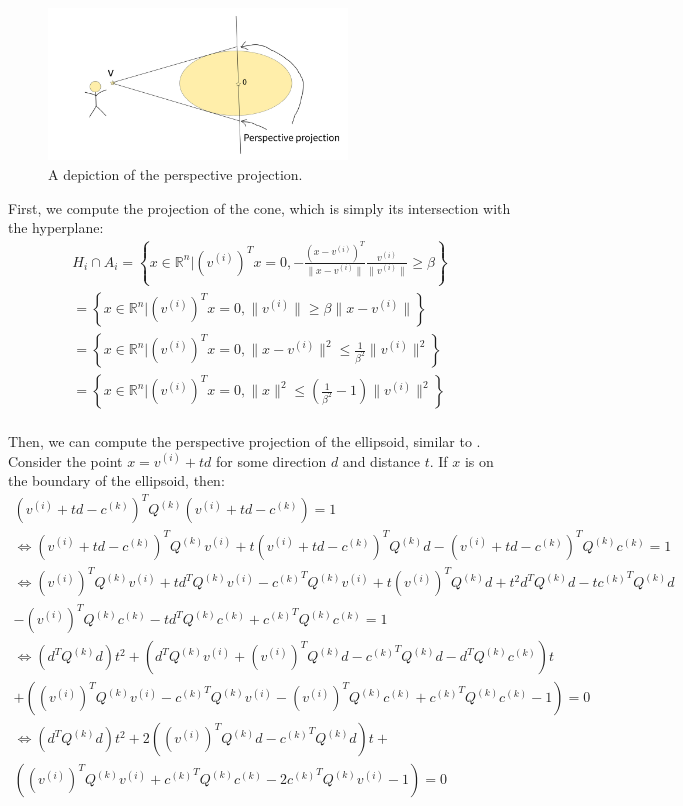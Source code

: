 \documentclass{article}
\theoremstyle{case}
\numberwithin{theorem}{subsection}
\newcommand{\ck}{{c^{(k)}}}
\newcommand{\qk}{{Q^{(k)}}}
\newcommand{\Rn}{\mathbb R^n}
\begin{document}
\begin{figure}[ht]
    \centering
    \includegraphics[width=300px]{images/perspective_projection.png}
    \caption{
    	A depiction of the perspective projection.
	}
    \label{perspective_projection_depiction}
\end{figure}

First, we compute the projection of the cone, which is simply its intersection with the hyperplane:
\begin{align*}
H_i \cap A_i 
= \left\{x \in \Rn \bigg| \left(v^{(i)}\right)^Tx = 0, -\frac{\left(x - v^{(i)}\right)^T}{\|x - v^{(i)}\|}\frac{v^{(i)}}{\|v^{(i)}\|}\ge \beta \right\} \\
= \left\{x \in \Rn \bigg| \left(v^{(i)}\right)^Tx = 0, \|v^{(i)}\|\ge \beta\|x - v^{(i)}\| \right\} \\
= \left\{x \in \Rn \bigg| \left(v^{(i)}\right)^Tx = 0, \|x - v^{(i)}\|^2 \le \frac 1 {\beta^2}\|v^{(i)}\|^2 \right\} \\
= \left\{x \in \Rn \bigg| \left(v^{(i)}\right)^Tx = 0, \|x\|^2 \le \left(\frac 1 {\beta^2} - 1\right)\|v^{(i)}\|^2 \right\} \\
\end{align*}

Then, we can compute the perspective projection of the ellipsoid, similar to \cite{eberly_2013}.
Consider the point $x = v^{(i)} + td$ for some direction $d$ and distance $t$.
If $x$ is on the boundary of the ellipsoid, then:
\begin{align*}
(v^{(i)} + t d - \ck )^T \qk  (v^{(i)} + t d - \ck ) = 1 \\
\Longleftrightarrow (v^{(i)} + t d - \ck )^T \qk  v^{(i)} + t (v^{(i)} + t d - \ck )^T \qk  d - (v^{(i)} + t d - \ck )^T \qk  \ck  = 1 \\
\Longleftrightarrow \left(v^{(i)}\right)^T \qk  v^{(i)} + t d^T \qk  v^{(i)} - \ck ^T \qk  v^{(i)} + t \left(v^{(i)}\right)^T \qk  d + t^2 d^T \qk  d - t \ck ^T \qk  d \\- \left(v^{(i)}\right)^T \qk  \ck  - t d^T \qk  \ck + \ck ^T \qk  \ck  = 1 \\
\Longleftrightarrow \left(d^T\qk d
\right) t^2 + \left(
d^T \qk  v^{(i)} +  \left(v^{(i)}\right)^T \qk  d - \ck ^T \qk  d - d^T \qk  \ck 
\right) t \\ +  \left(
\left(v^{(i)}\right)^T \qk  v^{(i)} - \ck ^T \qk  v^{(i)} - \left(v^{(i)}\right)^T \qk  \ck   + \ck ^T \qk  \ck  - 1
\right) = 0 \\
\Longleftrightarrow \left(d^T\qk d
\right) t^2 + 2\left(
\left(v^{(i)}\right)^T \qk  d - \ck ^T\qk d
\right) t + \\ \left(
\left(v^{(i)}\right)^T \qk  v^{(i)} + \ck ^T \qk  \ck  - 2 \ck ^T \qk  v^{(i)} - 1
\right) = 0
\end{align*}
\end{document}
